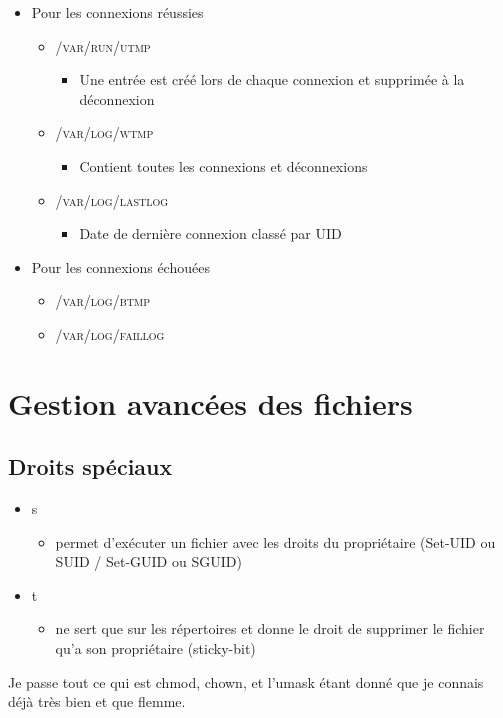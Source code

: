 \documentclass[a4paper]{article}
\begin{document}
    \begin{itemize}[label=\textbullet, font=\Large]
      \item Pour les connexions réussies
      \begin{itemize}[label=, font=\scriptsize]
        \item \textsc{/var/run/utmp}
        \begin{itemize}
          \item Une entrée est créé lors de chaque connexion et supprimée à la déconnexion
        \end{itemize}
        \item \textsc{/var/log/wtmp}
        \begin{itemize}
          \item Contient toutes les connexions et déconnexions
        \end{itemize}
        \item \textsc{/var/log/lastlog}
        \begin{itemize}
          \item Date de dernière connexion classé par UID
        \end{itemize}
      \end{itemize}
      \item Pour les connexions échouées
      \begin{itemize}[label=, font=\scriptsize]
        \item \textsc{/var/log/btmp}
        \item \textsc{/var/log/faillog}
      \end{itemize}
    \end{itemize}

    \section{Gestion avancées des fichiers}
    \subsection{Droits spéciaux}
    \begin{itemize}[label=\textbullet, font=\Large]
      \item s
      \begin{itemize}[label=, font=\scriptsize]
        \item permet d'exécuter un fichier avec les droits du propriétaire (Set-UID ou SUID / Set-GUID ou SGUID)
      \end{itemize}
      \item t
      \begin{itemize}[label=, font=\scriptsize]
        \item ne sert que sur les répertoires et donne le droit de supprimer le fichier qu'a son propriétaire (sticky-bit)
      \end{itemize}
    \end{itemize}
    Je passe tout ce qui est chmod, chown, et l'umask étant donné que je connais déjà très bien et que flemme.
\end{document}
